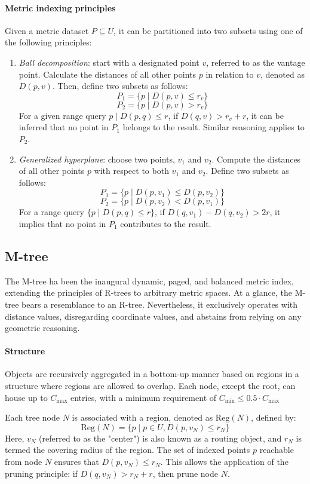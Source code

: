 \paragraph*{Metric indexing principles}
Given a metric dataset $P \subseteq U$, it can be partitioned into two subsets using one of the following principles:
\begin{enumerate}
    \item \textit{Ball decomposition}: start with a designated point $v$, referred to as the vantage point. 
        Calculate the distances of all other points $p$ in relation to $v$, denoted as $D(p,v)$. 
        Then, define two subsets as follows:
        \[P_1=\{p\mid D(p,v)\leq r_v\}\]
        \[P_2= \{p\mid D(p,v)>r_v\}\]
        For a given range query ${p\mid D(p,q)\leq r}$, if $D(q,v)>r_v+r$, it can be inferred that no point in $P_1$ belongs to the result. 
        Similar reasoning applies to $P_2$.
    \item \textit{Generalized hyperplane}: choose two points, $v_1$ and $v_2$. 
        Compute the distances of all other points $p$ with respect to both $v_1$ and $v_2$.     
        Define two subsets as follows:
        \[P_1=\{p\mid D(p,v_1)\leq D(p,v_2)\}\]
        \[P_2=\{p\mid D(p,v_2)<D(p,v_1)\}\]
        For a range query $\{p\mid D(p,q)\leq r\}$, if $D(q,v_1)-D(q,v_2)>2r$, it implies that no point in $P_1$ contributes to the result.
\end{enumerate}

\subsection{M-tree}
The M-tree ha been the inaugural dynamic, paged, and balanced metric index, extending the principles of R-trees to arbitrary metric spaces.
At a glance, the M-tree bears a resemblance to an R-tree. 
Nevertheless, it exclusively operates with distance values, disregarding coordinate values, and abstains from relying on any geometric reasoning.

\paragraph*{Structure}
Objects are recursively aggregated in a bottom-up manner based on regions in a structure where regions are allowed to overlap. 
Each node, except the root, can house up to $C_{\text{max}}$ entries, with a minimum requirement of $C_{\text{min}} \leq 0.5\cdot C_{\text{max}}$

Each tree node $N$ is associated with a region, denoted as $\text{Reg}(N)$, defined by:
\[\text{Reg}(N)=\{p\mid p\in U,D(p,v_N) \leq r_N\}\]
Here, $v_N$ (referred to as the "center") is also known as a routing object, and $r_N$ is termed the covering radius of the region. 
The set of indexed points $p$ reachable from node $N$ ensures that $D(p,v_N) \leq r_N$. 
This allows the application of the pruning principle: if $D(q,v_N)>r_N+r$, then prune node $N$.

